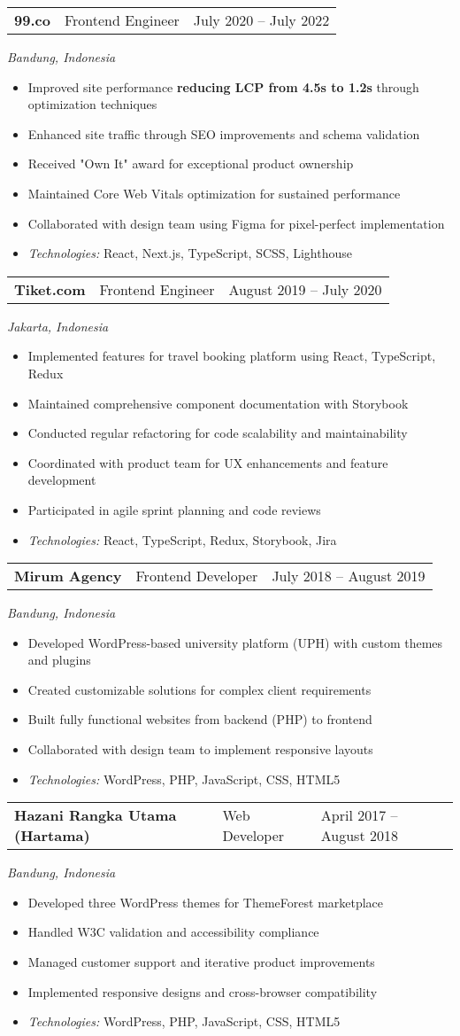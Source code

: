 \documentclass[a4paper, 11pt]{article}
\newcommand{\resumeItem}[1]{
  \item\small{
    {#1 \vspace{-2pt}}
  }
}
\newcommand{\resumeSubheading}[4]{
  \vspace{-2pt}\item
    \begin{tabularx}{0.987\textwidth}[t]{
  >{\raggedright\arraybackslash}X
  >{\centering\arraybackslash}X
  >{\raggedleft\arraybackslash}X }
      \textbf{#1} & #2 & #3 \\
    \end{tabularx}
    \textit{\small#4}\\
    \vspace{-7pt}
}
\newcommand{\resumeItemListStart}{\begin{itemize}[leftmargin=0.22in]}
\newcommand{\resumeItemListEnd}{\end{itemize}\vspace{-20pt}}
\begin{document}
      \resumeSubheading
        {99.co}{Frontend Engineer}{July 2020 -- July 2022}
        {Bandung, Indonesia}
        \resumeItemListStart
          \resumeItem{Improved site performance \textbf{reducing LCP from 4.5s to 1.2s} through optimization techniques}
          \resumeItem{Enhanced site traffic through SEO improvements and schema validation}
          \resumeItem{Received "Own It" award for exceptional product ownership}
          \resumeItem{Maintained Core Web Vitals optimization for sustained performance}
          \resumeItem{Collaborated with design team using Figma for pixel-perfect implementation}
          \resumeItem{\textit{Technologies:} React, Next.js, TypeScript, SCSS, Lighthouse}
        \resumeItemListEnd

      \resumeSubheading
        {Tiket.com}{Frontend Engineer}{August 2019 -- July 2020}
        {Jakarta, Indonesia}
        \resumeItemListStart
          \resumeItem{Implemented features for travel booking platform using React, TypeScript, Redux}
          \resumeItem{Maintained comprehensive component documentation with Storybook}
          \resumeItem{Conducted regular refactoring for code scalability and maintainability}
          \resumeItem{Coordinated with product team for UX enhancements and feature development}
          \resumeItem{Participated in agile sprint planning and code reviews}
          \resumeItem{\textit{Technologies:} React, TypeScript, Redux, Storybook, Jira}
        \resumeItemListEnd

      \resumeSubheading
        {Mirum Agency}{Frontend Developer}{July 2018 -- August 2019}
        {Bandung, Indonesia}
        \resumeItemListStart
          \resumeItem{Developed WordPress-based university platform (UPH) with custom themes and plugins}
          \resumeItem{Created customizable solutions for complex client requirements}
          \resumeItem{Built fully functional websites from backend (PHP) to frontend}
          \resumeItem{Collaborated with design team to implement responsive layouts}
          \resumeItem{\textit{Technologies:} WordPress, PHP, JavaScript, CSS, HTML5}
        \resumeItemListEnd

      \resumeSubheading
        {Hazani Rangka Utama (Hartama)}{Web Developer}{April 2017 -- August 2018}
        {Bandung, Indonesia}
        \resumeItemListStart
          \resumeItem{Developed three WordPress themes for ThemeForest marketplace}
          \resumeItem{Handled W3C validation and accessibility compliance}
          \resumeItem{Managed customer support and iterative product improvements}
          \resumeItem{Implemented responsive designs and cross-browser compatibility}
          \resumeItem{\textit{Technologies:} WordPress, PHP, JavaScript, CSS, HTML5}
        \resumeItemListEnd
\end{document}
